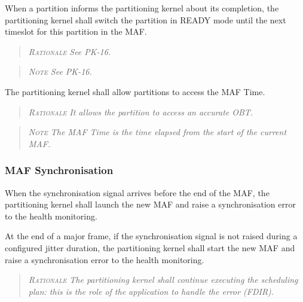 When a partition informs the partitioning kernel about its completion, the partitioning kernel shall switch the partition in READY mode until the next timeslot for this partition in the MAF.
\begin{quote}\it
\textsc{Rationale}
See PK-16.
\end{quote}
\begin{quote}\it
\textsc{Note}
See PK-16.
\end{quote}

The partitioning kernel shall allow partitions to access the MAF Time.
\begin{quote}\it
\textsc{Rationale}
It allows the partition to access an accurate OBT.
\end{quote}
\begin{quote}\it
\textsc{Note}
The MAF Time is the time elapsed from the start of the current MAF.
\end{quote}

\subsubsection*{MAF Synchronisation}

When the synchronisation signal arrives before the end of the MAF, the partitioning kernel shall launch the new MAF and raise a synchronisation error to the health monitoring.

At the end of a major frame, if the synchronisation signal is not raised during a configured jitter duration, the partitioning kernel shall start the new MAF and raise a synchronisation error to the health monitoring.
\begin{quote}\it
\textsc{Rationale}
The partitioning kernel shall continue executing the scheduling plan: this is the role of the application to handle the error (FDIR).
\end{quote}


%


